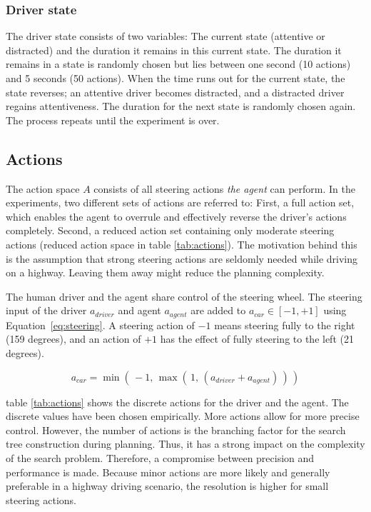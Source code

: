 \subsubsection*{Driver state}
\label{sec:driver_state}
The driver state consists of two variables: The current state (attentive or distracted) and the duration it remains in this current state. The duration it remains in a state is randomly chosen but lies between one second (10 actions) and 5 seconds (50 actions). When the time runs out for the current state, the state reverses; an attentive driver becomes distracted, and a distracted driver regains attentiveness. The duration for the next state is randomly chosen again. The process repeats until the experiment is over.

\subsection{Actions}
\label{sec:actions}


The action space $A$ consists of all steering actions \emph{the agent} can perform. In the experiments, two different sets of actions are referred to: First, a full action set, which enables the agent to overrule and effectively reverse the driver's actions completely. Second, a reduced action set containing only moderate steering actions (reduced action space in table \ref{tab:actions}). The motivation behind this is the assumption that strong steering actions are seldomly needed while driving on a highway. Leaving them away might reduce the planning complexity.

The human driver and the agent share control of the steering wheel. The steering input of the driver $a_{driver}$ and agent $a_{agent}$ are added to $a_{car} \in [-1, +1]$ using Equation~\ref{eq:steering}. A steering action of $-1$ means steering fully to the right (159 degrees), and an action of $+1$ has the effect of fully steering to the left (21 degrees). 

\begin{equation}
    a_{car} = \min(\, -1, \, \max(\, 1, \, (a_{driver} + a_{agent})\,)\,)
    \label{eq:steering}
\end{equation}

\vspace{1em}
\noindent
table \ref{tab:actions} shows the discrete actions for the driver and the agent. The discrete values have been chosen empirically. More actions allow for more precise control. However, the number of actions is the branching factor for the search tree construction during planning. Thus, it has a strong impact on the complexity of the search problem. Therefore, a compromise between precision and performance is made. Because minor actions are more likely and generally preferable in a highway driving scenario, the resolution is higher for small steering actions.

